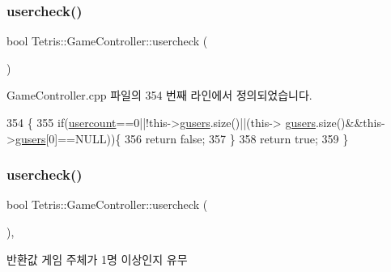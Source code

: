 \subsubsection{\texorpdfstring{usercheck()}{usercheck()}\hspace{0.1cm}{\footnotesize\ttfamily [1/2]}}
{\footnotesize\ttfamily bool Tetris\+::\+Game\+Controller\+::usercheck (\begin{DoxyParamCaption}{ }\end{DoxyParamCaption})\hspace{0.3cm}{\ttfamily [protected]}}



Game\+Controller.\+cpp 파일의 354 번째 라인에서 정의되었습니다.


\begin{DoxyCode}
354                                   \{
355                 \textcolor{keywordflow}{if}(\hyperlink{class_tetris_1_1_game_controller_aafb18b3b4fe5621bfb60fc42b1e8da09}{usercount}==0||!this->\hyperlink{class_tetris_1_1_game_controller_a1a31d3a933daad6d95e20458eea2900e}{gusers}.size()||(this->
      \hyperlink{class_tetris_1_1_game_controller_a1a31d3a933daad6d95e20458eea2900e}{gusers}.size()&&this->\hyperlink{class_tetris_1_1_game_controller_a1a31d3a933daad6d95e20458eea2900e}{gusers}[0]==NULL))\{
356                     \textcolor{keywordflow}{return} \textcolor{keyword}{false};
357                 \}
358                 \textcolor{keywordflow}{return} \textcolor{keyword}{true};
359             \}
\end{DoxyCode}
\mbox{\label{class_tetris_1_1_game_controller_ab96e22daad51119b35cbee8cfb7385ef}} 
\subsubsection{\texorpdfstring{usercheck()}{usercheck()}\hspace{0.1cm}{\footnotesize\ttfamily [2/2]}}
{\footnotesize\ttfamily bool Tetris\+::\+Game\+Controller\+::usercheck (\begin{DoxyParamCaption}{ }\end{DoxyParamCaption})\hspace{0.3cm}{\ttfamily [inline]}, {\ttfamily [protected]}}

\begin{DoxyReturn}{반환값}
게임 주체가 1명 이상인지 유무 
\end{DoxyReturn}


